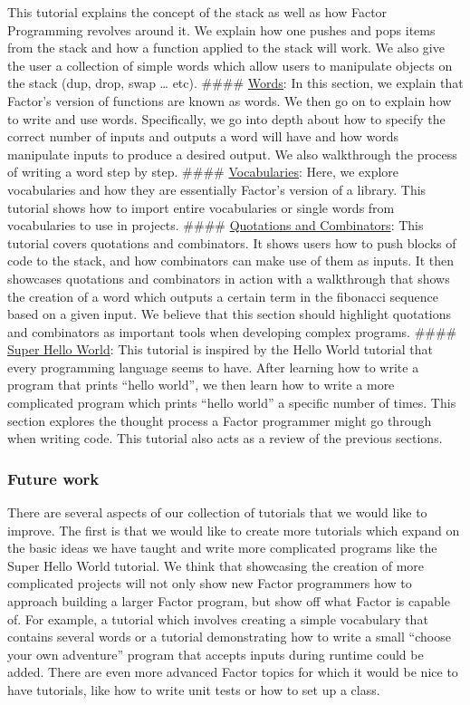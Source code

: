 \documentclass[
]{article}
\begin{document}
This tutorial explains the concept of the stack as well as how Factor
Programming revolves around it. We explain how one pushes and pops items
from the stack and how a function applied to the stack will work. We
also give the user a collection of simple words which allow users to
manipulate objects on the stack (dup, drop, swap \ldots{} etc). \#\#\#\#
\href{https://factor.netlify.app/book/words.md}{Words}: In this section,
we explain that Factor's version of functions are known as words. We
then go on to explain how to write and use words. Specifically, we go
into depth about how to specify the correct number of inputs and outputs
a word will have and how words manipulate inputs to produce a desired
output. We also walkthrough the process of writing a word step by step.
\#\#\#\#
\href{https://factor.netlify.app/book/vocabularies.md}{Vocabularies}:
Here, we explore vocabularies and how they are essentially Factor's
version of a library. This tutorial shows how to import entire
vocabularies or single words from vocabularies to use in projects.
\#\#\#\#
\href{https://factor.netlify.app/book/quotations_combinators.md}{Quotations
and Combinators}: This tutorial covers quotations and combinators. It
shows users how to push blocks of code to the stack, and how combinators
can make use of them as inputs. It then showcases quotations and
combinators in action with a walkthrough that shows the creation of a
word which outputs a certain term in the fibonacci sequence based on a
given input. We believe that this section should highlight quotations
and combinators as important tools when developing complex programs.
\#\#\#\#
\href{https://factor.netlify.app/book/Super_Hello_World.md}{Super Hello
World}: This tutorial is inspired by the Hello World tutorial that every
programming language seems to have. After learning how to write a
program that prints ``hello world'', we then learn how to write a more
complicated program which prints ``hello world'' a specific number of
times. This section explores the thought process a Factor programmer
might go through when writing code. This tutorial also acts as a review
of the previous sections.

\hypertarget{future-work}{%
\subsubsection{Future work}\label{future-work}}

There are several aspects of our collection of tutorials that we would
like to improve. The first is that we would like to create more
tutorials which expand on the basic ideas we have taught and write more
complicated programs like the Super Hello World tutorial. We think that
showcasing the creation of more complicated projects will not only show
new Factor programmers how to approach building a larger Factor program,
but show off what Factor is capable of. For example, a tutorial which
involves creating a simple vocabulary that contains several words or a
tutorial demonstrating how to write a small ``choose your own
adventure'' program that accepts inputs during runtime could be added.
There are even more advanced Factor topics for which it would be nice to
have tutorials, like how to write unit tests or how to set up a class.
\end{document}
